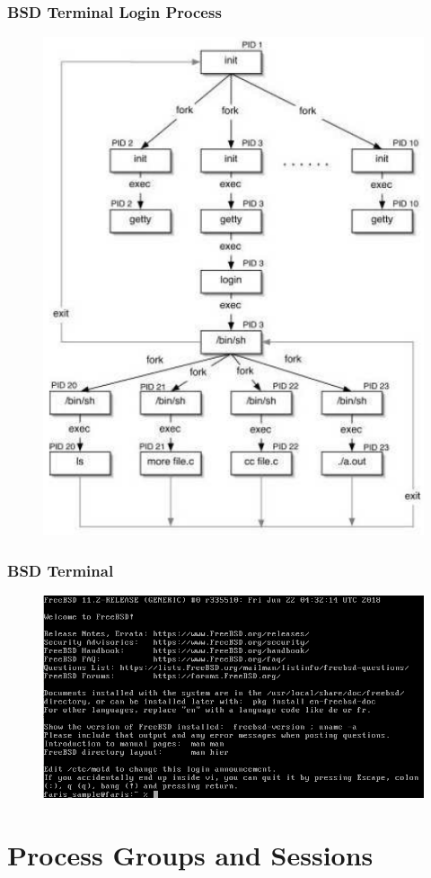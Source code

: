 \documentclass[newPxFont,sthlmFooter,nooffset]{beamer}
\begin{document}
\begin{frame}[t]
     \frametitle{BSD Terminal Login Process}
     \begin{figure}[h]
       \centering
       \includegraphics[width=0.5\linewidth]{figure/[5]LoginProc.png}
     \end{figure}
   \end{frame}

\begin{frame}[t]
  \frametitle{BSD Terminal}
  \begin{figure}[h]
    \centering
    \includegraphics[width=0.8\linewidth]{figure/[4]BSD.png}
  \end{figure}
\end{frame}




\section{Process Groups and Sessions}
\end{document}
